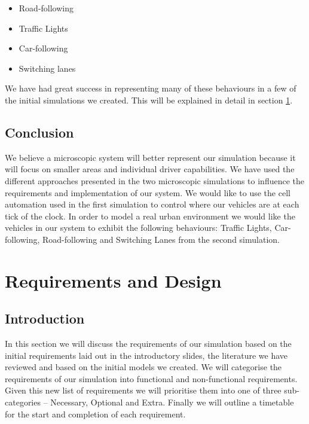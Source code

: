\documentclass{article}
\begin{document}
	\begin{itemize}
		\item Road-following
		\item Traffic Lights
		\item Car-following
		\item Switching lanes
	\end{itemize}
	We have had great success in representing many of these behaviours in a few of the initial simulations we created. 
	This will be explained in detail in section \ref{RequirementsAndDeisgn}. 
	
	
	\subsection{Conclusion}
	We believe a microscopic system will better represent our simulation because it will focus on smaller areas and individual driver capabilities. 
	We have used the different approaches presented in the two microscopic simulations to influence the requirements and implementation of our system. 
	We would like to use the cell automation used in the first simulation to control where our vehicles are at each tick of the clock. 
	In order to model a real urban environment we would like the vehicles in our system to exhibit the following behaviours: Traffic Lights, Car-following, Road-following and Switching Lanes from the second simulation.
	
	
	\section{Requirements and Design}\label{RequirementsAndDeisgn}
	
	\subsection{Introduction}
	In this section we will discuss the requirements of our simulation based on the initial requirements laid out in the introductory slides, the literature we have reviewed and based on the initial models we created. 
	We will categorise the requirements of our simulation into functional and non-functional requirements. Given this new list of requirements we will prioritise them into one of three sub-categories  -- Necessary, Optional and Extra. 
	Finally we will outline a timetable for the start and completion of each requirement.  
	
\end{document}
